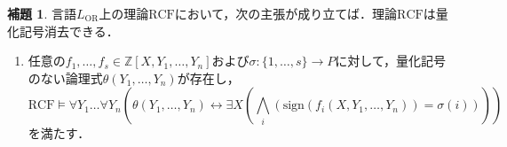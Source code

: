 \documentclass[uplatex, dvipdfmx]{jsarticle}
\numberwithin{equation}{section}
\newcommand{\Z}{\mathbb{Z}}
\newcommand{\RCF}{\mathrm{RCF}}
\newcommand{\sign}{\mathrm{sign}}
\newcommand{\map}[3]{{#1}\colon{#2}\rightarrow{#3}}
\theoremstyle{definition}
\newtheorem{lemma}[definition]{補題}
\begin{document}

\begin{lemma}\label{lemma:qe_simplify}
     言語$L_\mathrm{OR}$上の理論$\RCF$において，次の主張が成り立てば．理論$\RCF$は量化記号消去できる．

     \begin{enumerate}
          \item \label{qe_1}
          任意の$f_1, \dots, f_s \in \Z[X, Y_1, \dots, Y_n]$および$\map{\sigma}{\{1,\dots, s\}}{P}$に対して，量化記号のない論理式$\theta(Y_1, \dots, Y_n)$が存在し，
          \begin{equation}
               \RCF \models \forall Y_1 \dots \forall Y_n ( \theta(Y_1, \dots, Y_n) \leftrightarrow \exists X(\bigwedge_i (\sign(f_i(X,Y_1, \dots, Y_n))= \sigma(i))) )
          \end{equation}
          を満たす．
     \end{enumerate}
\end{lemma}
\end{document}
